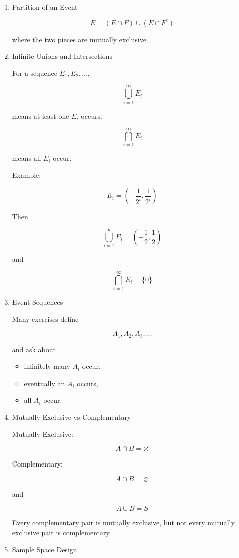 \documentclass[11pt]{article}
\begin{document}
\begin{enumerate}
Exactly one:

\[
(A\cap B^c\cap C^c)
\cup
(A^c\cap B\cap C^c)
\cup
(A^c\cap B^c\cap C)
\]

Exactly two:

\[
(A\cap B\cap C^c)
\cup
(A\cap B^c\cap C)
\cup
(A^c\cap B\cap C)
\]
\item Partition of an Event
\label{sec:orgec0d26d}

\[
E
=
(E\cap F)
\cup
(E\cap F^c)
\]

where the two pieces are mutually exclusive.
\item Infinite Unions and Intersections
\label{sec:org8662690}

For a sequence \(E_1,E_2,\ldots\),

\[
\bigcup_{i=1}^{\infty} E_i
\]

means at least one \(E_i\) occurs.

\[
\bigcap_{i=1}^{\infty} E_i
\]

means all \(E_i\) occur.

Example:

\[
E_i
=
\left(
-\frac{1}{2^i},
\frac{1}{2^i}
\right)
\]

Then

\[
\bigcup_{i=1}^{\infty} E_i
=
\left(
-\frac12,
\frac12
\right)
\]

and

\[
\bigcap_{i=1}^{\infty} E_i
=
\{0\}
\]
\item Event Sequences
\label{sec:orge878fc6}

Many exercises define

\[
A_1,A_2,A_3,\ldots
\]

and ask about

\begin{itemize}
\item infinitely many \(A_i\) occur,
\item eventually an \(A_i\) occurs,
\item all \(A_i\) occur.
\end{itemize}
\item Mutually Exclusive vs Complementary
\label{sec:org29192d6}

Mutually Exclusive:

\[
A\cap B=\varnothing
\]

Complementary:

\[
A\cap B=\varnothing
\]

and

\[
A\cup B=S
\]

Every complementary pair is mutually exclusive, but not every mutually exclusive pair is complementary.
\item Sample Space Design
\label{sec:org829a5e3}


\end{enumerate}
\end{document}
